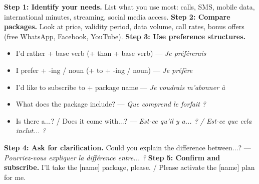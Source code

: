 \documentclass[11pt]{article}
\newcommand{\cle}[1]{{\popxbold\color{popdark}#1}}
\begin{document}
\begin{methode}
\textbf{Step 1: Identify your needs.} List what you use most: calls, SMS, mobile data, international minutes, streaming, social media access.
\textbf{Step 2: Compare packages.} Look at price, validity period, data volume, call rates, bonus offers (free WhatsApp, Facebook, YouTube).
\textbf{Step 3: Use preference structures.}
\begin{itemize}
    \item \cle{I'd rather} + base verb (+ than + base verb) — \emph{Je préférerais}
    \item \cle{I prefer} + -ing / noun (+ to + -ing / noun) — \emph{Je préfère}
    \item \cle{I'd like to subscribe to} + package name — \emph{Je voudrais m'abonner à}
    \item \cle{What does the package include?} — \emph{Que comprend le forfait ?}
    \item \cle{Is there a...?} / \cle{Does it come with...?} — \emph{Est-ce qu'il y a... ? / Est-ce que cela inclut... ?}
\end{itemize}
\textbf{Step 4: Ask for clarification.} \cle{Could you explain the difference between...?} — \emph{Pourriez-vous expliquer la différence entre... ?}
\textbf{Step 5: Confirm and subscribe.} \cle{I'll take the [name] package, please.} / \cle{Please activate the [name] plan for me.}
\end{methode}
\end{document}

